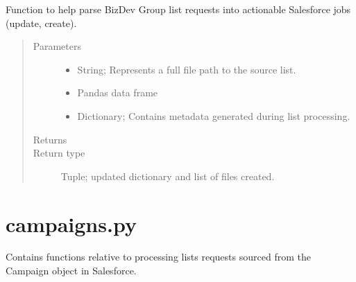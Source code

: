 \documentclass[letterpaper,10pt,english]{sphinxmanual}
\begin{document}

\begin{fulllineitems}
\label{\detokenize{index:ListManagement.sources.bdgs.parse}}
Function to help parse BizDev Group list requests into
actionable Salesforce jobs (update, create).
\begin{quote}\begin{description}
\item[{Parameters}] \leavevmode\begin{itemize}
\item {} 
 \textendash{} String; Represents a full file path to the source list.

\item {} 
 \textendash{} Pandas data frame

\item {} 
 \textendash{} Dictionary; Contains metadata generated during list processing.

\end{itemize}

\item[{Returns}] \leavevmode


\item[{Return type}] \leavevmode
Tuple; updated dictionary and list of files created.

\end{description}\end{quote}

\end{fulllineitems}

\label{\detokenize{index:module-ListManagement.sources.campaigns}}

\section{campaigns.py}
\label{\detokenize{index:campaigns-py}}
Contains functions relative to processing
lists requests sourced from the Campaign
object in Salesforce.
\end{document}
